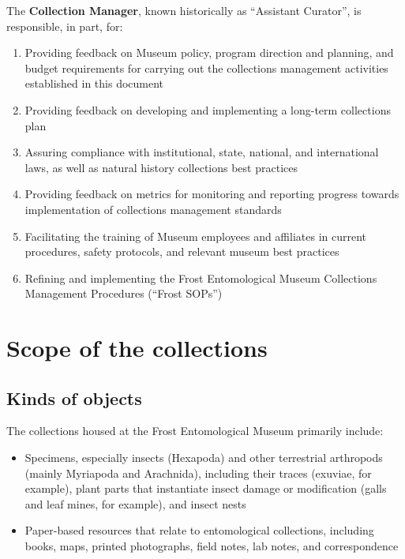 \documentclass[letterpaper, 11pt]{article}
\begin{document}
\noindent{}The \textbf{Collection Manager}, known historically as ``Assistant Curator'', is responsible, in part, for:
\begin{enumerate}
\item Providing feedback on Museum policy, program direction and planning, and budget requirements for carrying out the collections management activities established in this document
\item Providing feedback on developing and implementing a long-term collections plan
\item Assuring compliance with institutional, state, national, and international laws, as well as natural history collections best practices
\item Providing feedback on metrics for monitoring and reporting progress towards implementation of collections management standards
\item Facilitating the training of Museum employees and affiliates in current procedures, safety protocols, and relevant museum best practices
\item Refining and implementing the Frost Entomological Museum Collections Management Procedures (``Frost SOPs'')
\end{enumerate}

\clearpage
\section{Scope of the collections}
\subsection{Kinds of objects}
The collections housed at the Frost Entomological Museum primarily include:
\begin{itemize}
\item Specimens, especially insects (Hexapoda) and other terrestrial arthropods (mainly Myriapoda and Arachnida), including their traces (exuviae, for example), plant parts that instantiate insect damage or modification (galls and leaf mines, for example), and insect nests
\item Paper-based resources that relate to entomological collections, including books, maps, printed photographs, field notes, lab notes, and correspondence
\end{itemize}
\end{document}
